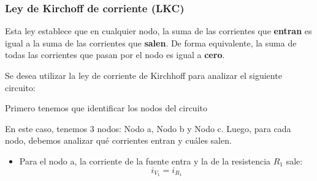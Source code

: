 \subsubsection{Ley de Kirchoff de corriente (LKC)}
Esta ley establece que en cualquier nodo, la suma de las corrientes que \textbf{entran} es igual a la suma de las corrientes que \textbf{salen}. De forma equivalente, la suma de todas las corrientes que pasan por el nodo es igual a \textbf{cero}.
\begin{example}
    Se desea utilizar la ley de corriente de Kirchhoff para analizar el siguiente circuito:


    Primero tenemos que identificar los nodos del circuito



    En este caso, tenemos 3 nodos: Nodo a, Nodo b y Nodo c. Luego, para cada nodo, debemos analizar qué corrientes entran y cuáles salen.
    \begin{itemize}
        \item Para el nodo a, la corriente de la fuente entra y la de la resistencia $R_1$ sale:
              \begin{equation*}
                  i_{V_1}=i_{R_1}
              \end{equation*}


\end{itemize}
\end{example}
